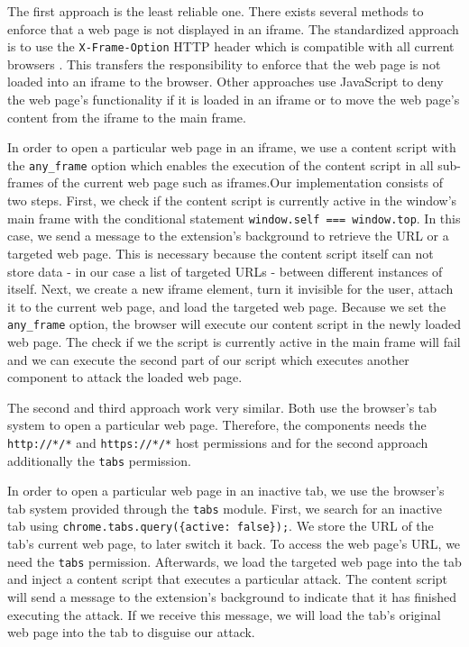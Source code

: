 	The first approach is the least reliable one. There exists several methods to enforce that a web page is not displayed in an iframe. The standardized approach is to use the \texttt{X-Frame-Option} HTTP header which is compatible with all current browsers \cite{xFrameOptionsSpezification, xFrameOptionsCompability}. This transfers the responsibility to enforce that the web page is not loaded into an iframe to the browser. Other approaches use JavaScript to deny the web page's functionality if it is loaded in an iframe or to move the web page's content from the iframe to the main frame.
		
	In order to open a particular web page in an iframe, we use a content script with the \texttt{any\_frame} option which enables the execution of the content script in all sub-frames of the current web page such as iframes.Our implementation consists of two steps. First, we check if the content script is currently active in the window's main frame with the conditional statement \lstinline|window.self === window.top|. In this case, we send a message to the extension's background to retrieve the URL or a targeted web page. This is necessary because the content script itself can not store data - in our case a list of targeted URLs - between different instances of itself. Next, we create a new iframe element, turn it invisible for the user, attach it to the current web page, and load the targeted web page. Because we set the \texttt{any\_frame} option, the browser will execute our content script in the newly loaded web page. The check if we the script is currently active in the main frame will fail and we can execute the second part of our script which executes another component to attack the loaded web page.
	
	The second and third approach work very similar. Both use the browser's tab system to open a particular web page. Therefore, the components needs the \texttt{http://*/*} and \texttt{https://*/*} host permissions and for the second approach additionally the \texttt{tabs} permission.
	
	In order to open a particular web page in an inactive tab, we use the browser's tab system provided through the \texttt{tabs} module. First, we search for an inactive tab using \lstinline|chrome.tabs.query({active: false});|. We store the URL of the tab's current web page, to later switch it back. To access the web page's URL, we need the \texttt{tabs} permission. Afterwards, we load the targeted web page into the tab and inject a content script that executes a particular attack. The content script will send a message to the extension's background to indicate that it has finished executing the attack. If we receive this message, we will load the tab's original web page into the tab to disguise our attack.
	
